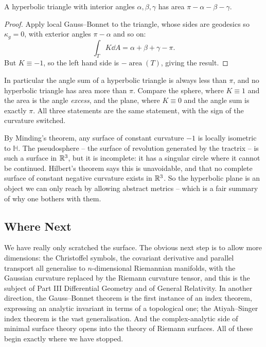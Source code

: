 \documentclass[a4paper]{scrartcl}
\newcommand{\HH}{\mathbb{H}}
\begin{document}
\begin{theorem}
    A hyperbolic triangle with interior angles $\alpha,\beta,\gamma$ has area $\pi - \alpha-\beta-\gamma$.
\end{theorem}
\begin{proof}
    Apply local Gauss--Bonnet to the triangle, whose sides are geodesics so $\kappa_g = 0$, with exterior angles $\pi - \alpha$ and so on:
    $$
    \int_T K \dd A = \alpha+\beta+\gamma-\pi.
    $$
    But $K \equiv -1$, so the left hand side is $-\operatorname{area}(T)$, giving the result.
\end{proof}

In particular the angle sum of a hyperbolic triangle is always less than $\pi$, and no hyperbolic triangle has area more than $\pi$. Compare the sphere, where $K \equiv 1$ and the area is the angle \emph{excess}, and the plane, where $K \equiv 0$ and the angle sum is exactly $\pi$. All three statements are the same statement, with the sign of the curvature switched.

\begin{remark}
    By Minding's theorem, any surface of constant curvature $-1$ is locally isometric to $\HH$. The pseudosphere -- the surface of revolution generated by the tractrix -- is such a surface in $\mathbb{R}^3$, but it is incomplete: it has a singular circle where it cannot be continued. Hilbert's theorem says this is unavoidable, and that no complete surface of constant negative curvature exists in $\mathbb{R}^3$. So the hyperbolic plane is an object we can only reach by allowing abstract metrics -- which is a fair summary of why one bothers with them.
\end{remark}

\subsection*{Where Next}

We have really only scratched the surface. The obvious next step is to allow more dimensions: the Christoffel symbols, the covariant derivative and parallel transport all generalise to $n$-dimensional Riemannian manifolds, with the Gaussian curvature replaced by the Riemann curvature tensor, and this is the subject of Part III Differential Geometry and of General Relativity. In another direction, the Gauss--Bonnet theorem is the first instance of an index theorem, expressing an analytic invariant in terms of a topological one; the Atiyah--Singer index theorem is the vast generalisation. And the complex-analytic side of minimal surface theory opens into the theory of Riemann surfaces. All of these begin exactly where we have stopped.
\end{document}
